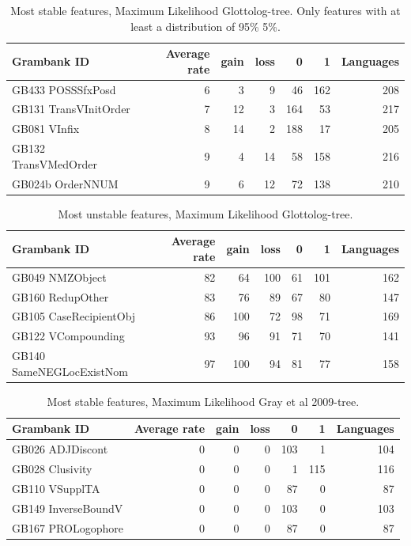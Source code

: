 \documentclass[draft,10pt]{article} %
\begin{document}
\begin{table}[H]
\centering
\begin{tabular}{lrrrrrr}
  \hline
Grambank ID & Average rate & gain & loss & 0 & 1 & Languages \\ 
  \hline
GB433 POSSSfxPosd & 6 & 3 & 9 & 46 & 162 & 208 \\ 
  GB131 TransVInitOrder & 7 & 12 & 3 & 164 & 53 & 217 \\ 
  GB081 VInfix & 8 & 14 & 2 & 188 & 17 & 205 \\ 
  GB132 TransVMedOrder & 9 & 4 & 14 & 58 & 158 & 216 \\ 
  GB024b OrderNNUM & 9 & 6 & 12 & 72 & 138 & 210 \\ 
   \hline
\end{tabular}
\caption{Most stable features, Maximum Likelihood Glottolog-tree. Only features with at least a distribution of 95\% \/ 5\%.} 
\label{stable_ML_glottolog_5}
\end{table}

\begin{table}[H]
\centering
\begin{tabular}{lrrrrrr}
  \hline
Grambank ID & Average rate & gain & loss & 0 & 1 & Languages \\ 
  \hline
GB049 NMZObject & 82 & 64 & 100 & 61 & 101 & 162 \\ 
  GB160 RedupOther & 83 & 76 & 89 & 67 & 80 & 147 \\ 
  GB105 CaseRecipientObj & 86 & 100 & 72 & 98 & 71 & 169 \\ 
  GB122 VCompounding & 93 & 96 & 91 & 71 & 70 & 141 \\ 
  GB140 SameNEGLocExistNom & 97 & 100 & 94 & 81 & 77 & 158 \\ 
   \hline
\end{tabular}
\caption{Most unstable features, Maximum Likelihood Glottolog-tree.} 
\label{unstable_ML_glottolog}
\end{table}

\begin{table}[H]
\centering
\begin{tabular}{lrrrrrr}
  \hline
Grambank ID & Average rate & gain & loss & 0 & 1 & Languages \\ 
  \hline
GB026 ADJDiscont & 0 & 0 & 0 & 103 & 1 & 104 \\ 
  GB028 Clusivity & 0 & 0 & 0 & 1 & 115 & 116 \\ 
  GB110 VSupplTA & 0 & 0 & 0 & 87 & 0 & 87 \\ 
  GB149 InverseBoundV & 0 & 0 & 0 & 103 & 0 & 103 \\ 
  GB167 PROLogophore & 0 & 0 & 0 & 87 & 0 & 87 \\ 
   \hline
\end{tabular}
\caption{Most stable features, Maximum Likelihood Gray et al 2009-tree.} 
\label{stable_ML_gray}
\end{table}
\end{document}
